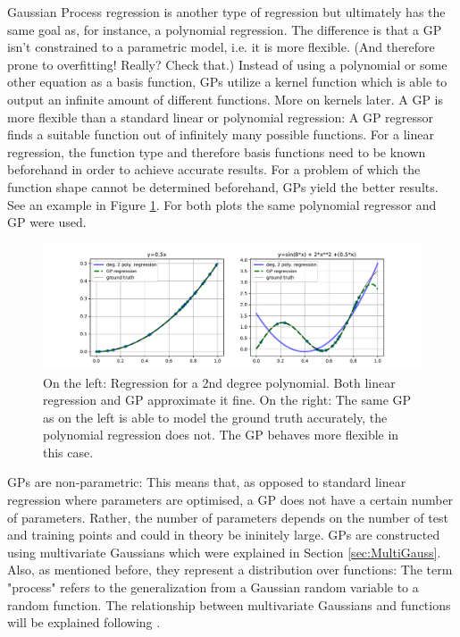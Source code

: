 \documentclass[%
  a4paper,oneside,%
  11pt,%
  smallchapters,
  style=printdev,
  extramargin,
  green,%
  rgb, <cmyk>
  ]{tubsbook}
\begin{document}
Gaussian Process regression is another type of regression but ultimately has the same goal as, for instance, a polynomial regression. The difference is that a GP isn't constrained to a parametric model, i.e. it is more flexible. (And therefore prone to overfitting! Really? Check that.) Instead of using a polynomial or some other equation as a basis function, GPs utilize a kernel function which is able to output an infinite amount of different functions. More on kernels later.
A GP is more flexible than a standard linear or polynomial regression: A GP regressor finds a suitable function out of infinitely many possible functions. For a linear regression, the function type and therefore basis functions need to be known beforehand in order to achieve accurate results. For a problem of which the function shape cannot be determined beforehand, GPs yield the better results. See an example in Figure \ref{fig:GPvsReg}. For both plots the same polynomial regressor and GP were used.
\begin{figure}[!ht]
\begin{center}
\includegraphics[width=1.1\textwidth]{pics/GPvsReg}
\caption{On the left: Regression for a 2nd degree polynomial. Both linear regression and GP approximate it fine. On the right: The same GP as on the left is able to model the ground truth accurately, the polynomial regression does not. The GP behaves more flexible in this case.}
\label{fig:GPvsReg}
\end{center}
\end{figure}
GPs are non-parametric: This means that, as opposed to standard linear regression where parameters are optimised, a GP does not have a certain number of parameters. Rather, the number of parameters depends on the number of test and training points and could in theory be ininitely large. \cite{murphy2012} 
GPs are constructed using multivariate Gaussians which were explained in Section \ref{sec:MultiGauss}. Also, as mentioned before, they represent a distribution over functions: The term "process" refers to the generalization from a Gaussian random variable to a random function. \cite[p.13]{rasmussen2006}  The relationship between multivariate Gaussians and functions will be explained following \cite{damianou2021}.
\end{document}
